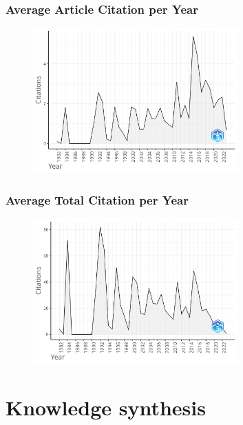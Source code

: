 \documentclass[aspectratio=169]{beamer}
\begin{document}
\begin{frame}
	\frametitle{Average Article Citation per Year}
	\begin{figure}
		\centering
		\includegraphics[width=0.7\textwidth]{figures/AverArtCitperYear.png}
	\end{figure}
\end{frame}

\begin{frame}
	\frametitle{Average Total Citation per Year}
	\begin{figure}
		\centering
		\includegraphics[width=0.7\textwidth]{figures/AverTotCitperYear.png}
	\end{figure}
\end{frame}



\section{Knowledge synthesis}
\end{document}

